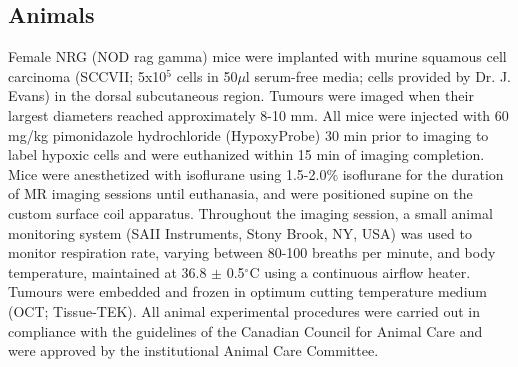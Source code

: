 \subsection{Animals}
Female NRG (NOD rag gamma) mice were implanted with murine squamous cell carcinoma (SCCVII; 5x10$^5$ cells in 50$\mu$l serum-free media; cells provided by Dr. J. Evans) in the dorsal subcutaneous region.
Tumours were imaged when their largest diameters reached approximately 8-10 mm.
All mice were injected with 60 mg/kg pimonidazole hydrochloride (HypoxyProbe) 30 min prior to imaging to label hypoxic cells and were euthanized within 15 min of imaging completion.
Mice were anesthetized with isoflurane using 1.5-2.0\% isoflurane for the duration of MR imaging sessions until euthanasia, and were positioned supine on the custom surface coil apparatus.
Throughout the imaging session, a small animal monitoring system (SAII Instruments, Stony Brook, NY, USA) was used to monitor respiration rate, varying between 80-100 breaths per minute, and body temperature, maintained at 36.8 $\pm$ 0.5$^\circ$C using a continuous airflow heater. 
Tumours were embedded and frozen in optimum cutting temperature medium (OCT; Tissue-TEK).
All animal experimental procedures were carried out in compliance with the guidelines of the Canadian Council for Animal Care and were approved by the institutional Animal Care Committee.

